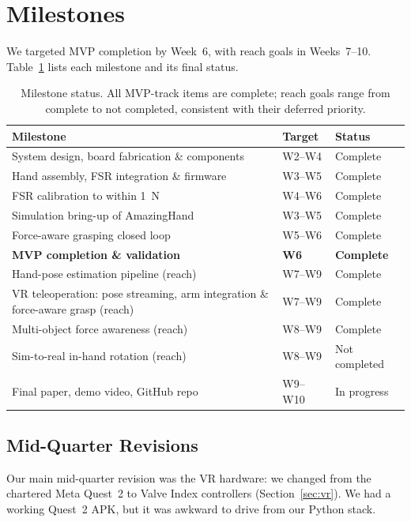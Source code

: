 \documentclass[acmlarge,screen,nonacm]{acmart}
\begin{document}
\section{Milestones}
\label{sec:milestones}
We targeted MVP completion by Week~6, with reach goals in Weeks~7--10.
Table~\ref{tab:milestones} lists each milestone and its final status.

\begin{table}[t]
\caption{Milestone status. All MVP-track items are complete; reach goals range
from complete to not completed, consistent with their deferred priority.}
\label{tab:milestones}
\small
\renewcommand{\arraystretch}{1.05}
\begin{tabularx}{\linewidth}{@{}Xll@{}}
\toprule
\textbf{Milestone} & \textbf{Target} & \textbf{Status} \\
\midrule
System design, board fabrication \& components & W2--W4 & Complete \\
Hand assembly, FSR integration \& firmware     & W3--W5 & Complete \\
FSR calibration to within 1~N                  & W4--W6 & Complete \\
Simulation bring-up of AmazingHand             & W3--W5 & Complete \\
Force-aware grasping closed loop               & W5--W6 & Complete \\
\textbf{MVP completion \& validation}          & \textbf{W6} & \textbf{Complete} \\
Hand-pose estimation pipeline (reach)          & W7--W9 & Complete \\
VR teleoperation: pose streaming, arm integration \& force-aware grasp (reach) & W7--W9 & Complete \\
Multi-object force awareness (reach)           & W8--W9 & Complete \\
Sim-to-real in-hand rotation (reach)           & W8--W9 & Not completed \\
Final paper, demo video, GitHub repo           & W9--W10 & In progress \\
\bottomrule
\end{tabularx}
\end{table}

\subsection{Mid-Quarter Revisions}
Our main mid-quarter revision was the VR hardware: we changed from the chartered
Meta Quest~2 to Valve Index controllers (Section~\ref{sec:vr}). We had a working
Quest~2 APK, but it was awkward to drive from our Python stack.
\end{document}
